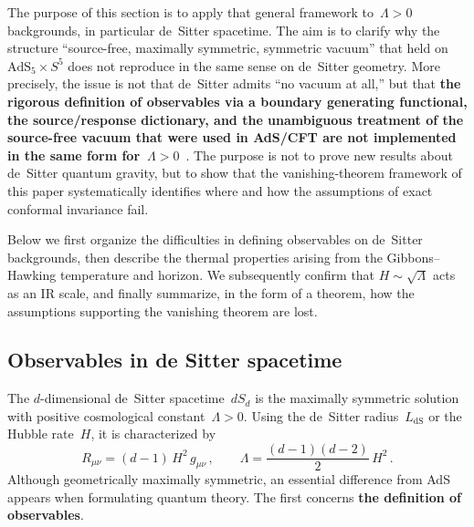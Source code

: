 \documentclass[
  aps,
  prd,
  preprint,
  groupedaddress,
  nofootinbib,
  longbibliography
]{revtex4-2}
\theoremstyle{remark}
\newcommand{\AdS}{\mathrm{AdS}}
\newcommand{\dS}{\mathrm{dS}}
\begin{document}
The purpose of this section is to apply that general framework
to~$\Lambda>0$ backgrounds, in particular de~Sitter spacetime.
The aim is to clarify why the structure
``source-free, maximally symmetric, symmetric vacuum''
that held on~$\AdS_5\times S^5$ does not reproduce in the same
sense on de~Sitter geometry.
More precisely, the issue is not that de~Sitter admits ``no vacuum
at all,'' but that \textbf{the rigorous definition of observables
via a boundary generating functional, the source/response
dictionary, and the unambiguous treatment of the source-free vacuum
that were used in AdS/CFT are not implemented in the same form
for~$\Lambda>0$}~\cite{ref15,ref16,ref17,ref18,ref19,ref20,ref21}.
The purpose is not to prove new results about de~Sitter
quantum gravity, but to show that the vanishing-theorem
framework of this paper systematically identifies where and
how the assumptions of exact conformal invariance fail.

Below we first organize the difficulties in defining observables on
de~Sitter backgrounds, then describe the thermal properties arising
from the Gibbons--Hawking temperature and horizon.
We subsequently confirm that $H\sim\sqrt{\Lambda}$ acts as an IR
scale, and finally summarize, in the form of a theorem, how the
assumptions supporting the vanishing theorem are lost.

\subsection{Observables in de Sitter spacetime}\label{subsec:4-1}

The $d$-dimensional de~Sitter spacetime~$dS_d$ is the maximally
symmetric solution with positive cosmological
constant~$\Lambda>0$.
Using the de~Sitter radius~$L_{\dS}$ or the Hubble
rate~$H$, it is characterized
by~\cite{ref17,ref20,ref21}
\begin{equation}\label{eq:dS-curvature}
  R_{\mu\nu} = (d-1)\,H^2\,g_{\mu\nu}\,,
  \qquad
  \Lambda = \frac{(d-1)(d-2)}{2}\,H^2\,.
\end{equation}
Although geometrically maximally symmetric, an essential
difference from AdS appears when formulating quantum theory.
The first concerns \textbf{the definition of observables}.
\end{document}

